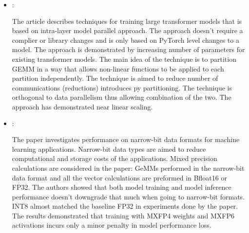 \begin{itemize}
    \item \cite{Shoeybi:MegatronLM:2020}:

    The article describes techniques for training large transformer models that is based on intra-layer model parallel approach. The approach doesn't require a complier or library changes and is only based on PyTorch level changes to a model. The approach is demonstrated by increasing number of parameters for existing transformer models. The main idea of the technique is to partition GEMM in a way that allows non-linear functions to be applied to each partition independently. The technique is aimed to reduce number of communications (reductions) introduces py partitioning. The technique is orthogonal to data parallelism thus allowing combination of the two. The approach has demonstrated near linear scaling.

    \item \cite{Rouhani:Microscaling:2023}:

    The paper investigates performance on narrow-bit data formats for machine learning applications. Narrow-bit data types are aimed to reduce computational and storage costs of the applications. Mixed precision calculations are considered in the paper: GeMMs performed in the narrow-bit data format and all the vector calculations are preformed in Bfloat16 or FP32. The authors showed that both model training and model inference performance doesn't downgrade that much when going to narrow-bit formats. INT8 almost matched the baseline FP32 in experiments done by the paper. The results demonstrated that training with MXFP4 weights and MXFP6 activations incurs only a minor penalty in model performance loss.
\end{itemize}

